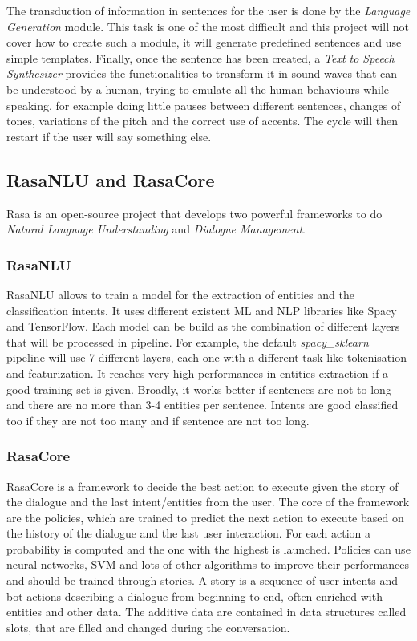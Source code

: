 \documentclass[11pt,a4paper]{article}
\begin{document}
The transduction of information in sentences for the user is done by the \textit{Language Generation} module. This task is one of the most difficult and this project will not cover how to create such a module, it will generate predefined sentences and use simple templates.
Finally, once the sentence has been created, a \textit{Text to Speech Synthesizer} provides the functionalities to transform it in sound-waves that can be understood by a human, trying to emulate all the human behaviours while speaking, for example doing little pauses between different sentences, changes of tones, variations of the pitch and the correct use of accents. The cycle will then restart if the user will say something else.
 
\subsection{RasaNLU and RasaCore}

Rasa is an open-source project that develops two powerful frameworks to do \textit{Natural Language Understanding} and \textit{Dialogue Management}. 

\subsubsection{RasaNLU}

RasaNLU allows to train a model for the extraction of entities and the classification intents. It uses different existent ML and NLP libraries like Spacy and TensorFlow. Each model can be build as the combination of different layers that will be processed in pipeline. For example, the default \textit{spacy\_sklearn} pipeline will use 7 different layers, each one with a different task like tokenisation and featurization. It reaches very high performances in entities extraction if a good training set is given. Broadly, it works better if sentences are not to long and there are no more than 3-4 entities per sentence. Intents are good classified too if they are not too many and if sentence are not too long. 

\subsubsection{RasaCore}

RasaCore is a framework to decide the best action to execute given the story of the dialogue and the last intent/entities from the user. The core of the framework are the policies, which are trained to predict the next action to execute based on the history of the dialogue and the last user interaction. For each action a probability is computed and the one with the highest is launched. Policies can use neural networks, SVM and lots of other algorithms to improve their performances and should be trained through stories. A story is a sequence of user intents and bot actions describing a dialogue from beginning to end, often enriched with entities and other data. The additive data are contained in data structures called slots, that are filled and changed during the conversation.
\end{document}
